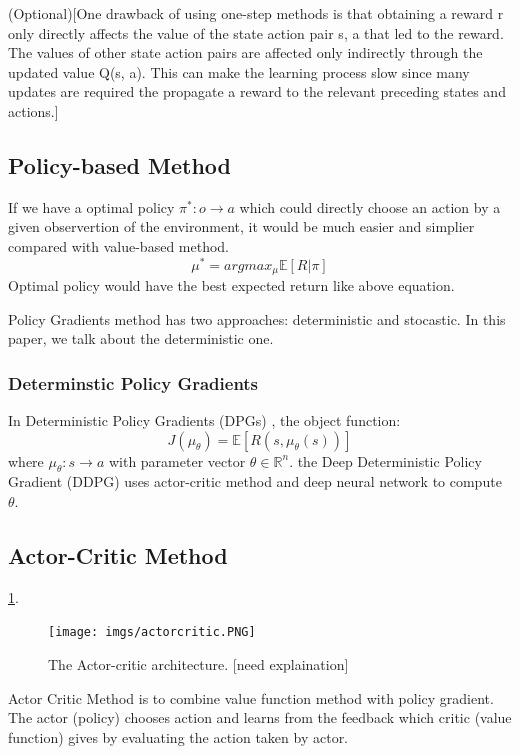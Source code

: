\documentclass[11pt,twocolumn]{jarticle} %
\begin{document}
(Optional)[One drawback of using one-step methods is that obtaining a reward r only directly affects the value of the state action pair s, a that led to the reward. The values of other state action pairs are affected only indirectly through the updated value Q(s, a). This can make the learning process slow since many updates are required the propagate a reward to the relevant
preceding states and actions.]

\subsection{Policy-based Method}
If we have a optimal policy $\pi^*: o \rightarrow a$ which could directly choose an action by a given observertion of the environment, it would be much easier and simplier compared with value-based method. 
$$\mu^* = argmax_\mu\mathbb{E}[R|\pi]$$
Optimal policy would have the best expected return like above equation. \par
Policy Gradients method has two approaches: deterministic and stocastic. In this paper, we talk about the deterministic one.

\subsubsection{Determinstic Policy Gradients}

In Deterministic Policy Gradients (DPGs) \cite{dpg}, the object function:
$$J(\mu_\theta) = \mathbb{E}[R(s, \mu_\theta(s))]$$
where $\mu_\theta: s \rightarrow a$ with parameter vector $\theta \in \mathbb{R}^n$. the Deep Deterministic Policy Gradient (DDPG) uses actor-critic method and deep neural network to compute $\theta$.

\subsection{Actor-Critic Method}
\ref{fig:rl}. \par
\begin{figure}[h]
 \begin{center}
  \texttt{[image: imgs/actorcritic.PNG]}
  \caption{
  The Actor-critic architecture. [need explaination]
  }
  \label{fig:rl}
 \end{center}
\end{figure}
Actor Critic Method is to combine value function method with policy gradient. The actor (policy) chooses action and learns from the feedback which critic (value function) gives by evaluating the action taken by actor.
\end{document}
